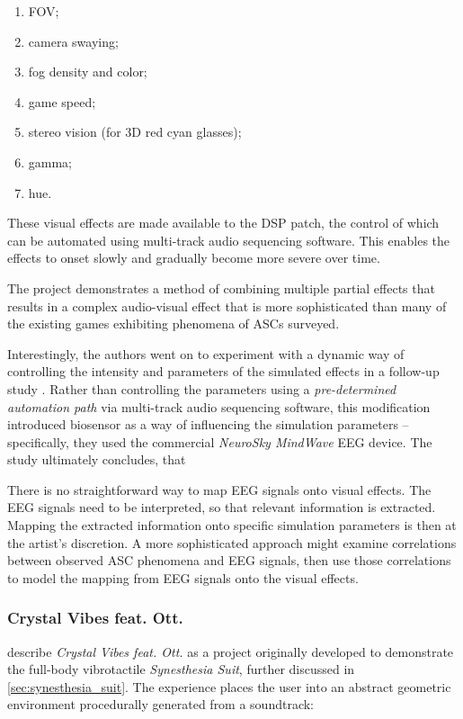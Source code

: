 \begin{enumerate}
    \item \ac{FOV};
    \item camera swaying;
    \item fog density and color;
    \item game speed;
    \item stereo vision (for 3D red cyan glasses);
    \item gamma;
    \item hue.
\end{enumerate}

These visual effects are made available to the \ac{DSP} patch, the control of which can be automated using multi-track audio sequencing software. This enables the effects to onset slowly and gradually become more severe over time.

The project demonstrates a method of combining multiple partial effects that results in a complex audio-visual effect that is more sophisticated than many of the existing games exhibiting phenomena of \acp{ASC} surveyed.

Interestingly, the authors went on to experiment with a dynamic way of controlling the intensity and parameters of the simulated effects in a follow-up study \autocite{weinel2015quake}. Rather than controlling the parameters using a \textit{pre-determined automation path} via multi-track audio sequencing software, this modification introduced biosensor as a way of influencing the simulation parameters -- specifically, they used the commercial \textit{NeuroSky MindWave} \ac{EEG} device. The study ultimately concludes, that 

There is no straightforward way to map \ac{EEG} signals onto visual effects. The \ac{EEG} signals need to be interpreted, so that relevant information is extracted. Mapping the extracted information onto specific simulation parameters is then at the artist's discretion. A more sophisticated approach might examine correlations between observed \ac{ASC} phenomena and \ac{EEG} signals, then use those correlations to model the mapping from \ac{EEG} signals onto the visual effects.

\subsubsection{Crystal Vibes feat. Ott.}
\textcite{outram2017crystal} describe \textit{Crystal Vibes feat. Ott.} as a project originally developed to demonstrate the full-body vibrotactile \textit{Synesthesia Suit}, further discussed in \ref{sec:synesthesia_suit}. The experience places the user into an abstract geometric environment procedurally generated from a soundtrack:


